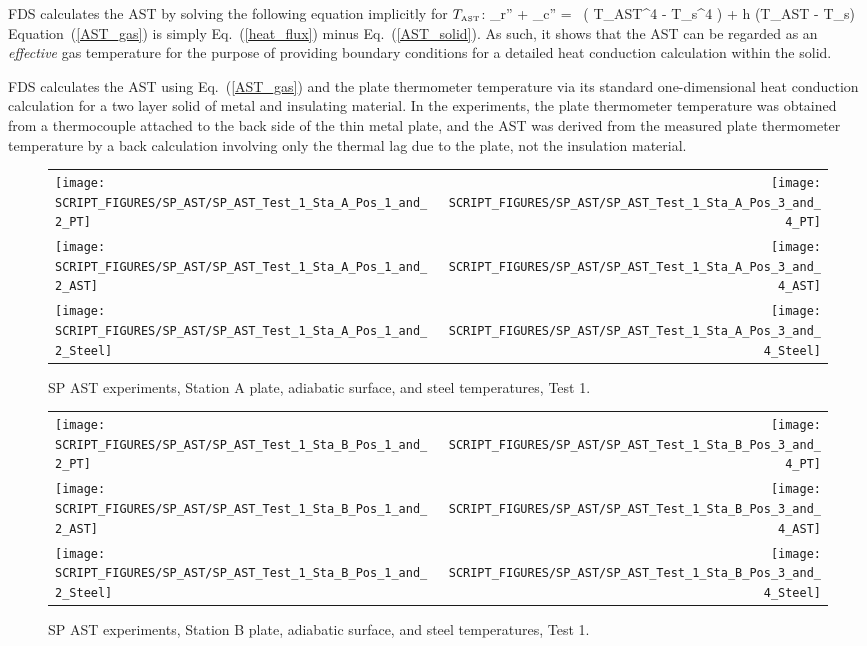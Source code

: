 FDS calculates the AST by solving the following equation implicitly for $T_{\hbox{\tiny AST}}$:
\be {}_r'' + _c'' = \epsilon \, \left( \sigma T_{\hbox{\tiny AST}}^4 - \sigma T_s^4 \right) + h (T_{\hbox{\tiny AST}} - T_s)  \label{AST_gas} \ee
Equation~(\ref{AST_gas}) is simply Eq.~(\ref{heat_flux}) minus Eq.~(\ref{AST_solid}). As such, it shows that the AST can be regarded as an {\em effective} gas temperature for
the purpose of providing boundary conditions for a detailed heat conduction calculation within the solid.

FDS calculates the AST using Eq.~(\ref{AST_gas}) and the plate thermometer temperature via its standard one-dimensional heat conduction calculation for a
two layer solid of metal and insulating material. In the experiments, the plate thermometer temperature was obtained from a thermocouple attached to the back side of
the thin metal plate, and the AST was derived from the measured plate thermometer temperature by a back calculation involving only the thermal lag due to the
plate, not the insulation material.

\newpage


\begin{figure}[p]
\begin{tabular*}{\textwidth}{l@{\extracolsep{\fill}}r}
\texttt{[image: SCRIPT\_FIGURES/SP\_AST/SP\_AST\_Test\_1\_Sta\_A\_Pos\_1\_and\_2\_PT]} &
\texttt{[image: SCRIPT\_FIGURES/SP\_AST/SP\_AST\_Test\_1\_Sta\_A\_Pos\_3\_and\_4\_PT]} \\
\texttt{[image: SCRIPT\_FIGURES/SP\_AST/SP\_AST\_Test\_1\_Sta\_A\_Pos\_1\_and\_2\_AST]} &
\texttt{[image: SCRIPT\_FIGURES/SP\_AST/SP\_AST\_Test\_1\_Sta\_A\_Pos\_3\_and\_4\_AST]} \\
\texttt{[image: SCRIPT\_FIGURES/SP\_AST/SP\_AST\_Test\_1\_Sta\_A\_Pos\_1\_and\_2\_Steel]} &
\texttt{[image: SCRIPT\_FIGURES/SP\_AST/SP\_AST\_Test\_1\_Sta\_A\_Pos\_3\_and\_4\_Steel]}
\end{tabular*}
\caption{SP AST experiments, Station A plate, adiabatic surface, and steel temperatures, Test 1.}
\label{SP_Test_1_Station_A}
\end{figure}

\begin{figure}[p]
\begin{tabular*}{\textwidth}{l@{\extracolsep{\fill}}r}
\texttt{[image: SCRIPT\_FIGURES/SP\_AST/SP\_AST\_Test\_1\_Sta\_B\_Pos\_1\_and\_2\_PT]} &
\texttt{[image: SCRIPT\_FIGURES/SP\_AST/SP\_AST\_Test\_1\_Sta\_B\_Pos\_3\_and\_4\_PT]} \\
\texttt{[image: SCRIPT\_FIGURES/SP\_AST/SP\_AST\_Test\_1\_Sta\_B\_Pos\_1\_and\_2\_AST]} &
\texttt{[image: SCRIPT\_FIGURES/SP\_AST/SP\_AST\_Test\_1\_Sta\_B\_Pos\_3\_and\_4\_AST]} \\
\texttt{[image: SCRIPT\_FIGURES/SP\_AST/SP\_AST\_Test\_1\_Sta\_B\_Pos\_1\_and\_2\_Steel]} &
\texttt{[image: SCRIPT\_FIGURES/SP\_AST/SP\_AST\_Test\_1\_Sta\_B\_Pos\_3\_and\_4\_Steel]}
\end{tabular*}
\caption{SP AST experiments, Station B plate, adiabatic surface, and steel temperatures, Test 1.}
\label{SP_Test_1_Station_B}
\end{figure}


